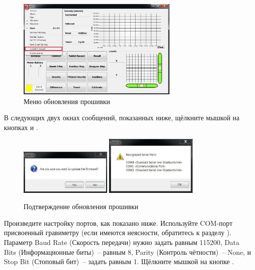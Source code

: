 \begin{figure}[H]
  \centering
  \includegraphics[width=0.7\textwidth]{figures/update_firmware_pull-down_menu}
  \caption{Меню обновления прошивки}
  \label{fig:update_firmware_pull-down_menu}
\end{figure}

В следующих двух окнах сообщений, показанных ниже, щёлкните мышкой на
кнопках  и .

\begin{figure}[H]
  \centering
  \includegraphics[width=0.4\textwidth]{figures/confirming_the_firmware_update_1}
  \includegraphics[width=0.4\textwidth]{figures/confirming_the_firmware_update_2}
  \caption{Подтверждение обновления прошивки}
  \label{fig:confirming_the_firmware_update}
\end{figure}

Произведите настройку портов, как показано ниже. Используйте COM-порт
присвоенный гравиметру \cg{} (если имеются неясности, обратитесь к разделу
). Параметр Baud Rate
(Скорость передачи) нужно задать равным 115200, Data Bits (Информационные
биты)~-- равным 8, Parity (Контроль чётности)~-- None, и Stop Bit (Стоповый
бит)~-- задать равным 1. Щёлкните мышкой на кнопке .

